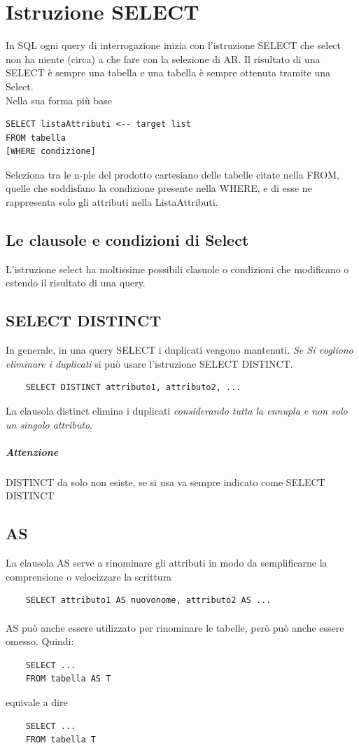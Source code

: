\documentclass[12pt, a4paper, openany]{book}
\begin{document}
\section{Istruzione SELECT}
In SQL ogni query di interrogazione inizia con l'istruzione SELECT che select non ha niente (circa) a che fare con la selezione di AR. Il risultato di una SELECT è sempre una tabella e una tabella è sempre ottenuta tramite una Select.
\\Nella sua forma più base
\begin{lstlisting}
SELECT listaAttributi <-- target list
FROM tabella
[WHERE condizione]
\end{lstlisting}
Seleziona tra le n-ple del prodotto cartesiano delle tabelle citate nella
FROM, quelle che soddisfano la condizione presente nella WHERE, e di
esse ne rappresenta solo gli attributi nella ListaAttributi.
\subsection{Le clausole e condizioni di Select}
L'istruzione select ha moltissime possibili clasuole o condizioni che modificano o estendo il risultato di una query.

\subsection*{SELECT DISTINCT} 
In generale, in una query SELECT i duplicati vengono mantenuti. \emph{Se Si vogliono eliminare i duplicati} si può usare l'istruzione SELECT DISTINCT.
\begin{verbatim}
    SELECT DISTINCT attributo1, attributo2, ...
\end{verbatim}
La clausola distinct elimina i duplicati \emph{considerando tutta la ennupla e non solo un singolo attributo}.
\subparagraph{Attenzione} DISTINCT da solo non esiste, se si usa va sempre indicato come SELECT DISTINCT

\subsection*{AS}
La clausola AS serve a rinominare gli attributi in modo da semplificarne la comprensione o velocizzare la scrittura
\begin{verbatim}
    SELECT attributo1 AS nuovonome, attributo2 AS ...
\end{verbatim}

\paragraph*{} AS può anche essere utilizzato per rinominare le tabelle, però può anche essere omesso. Quindi:
\begin{verbatim}
    SELECT ...
    FROM tabella AS T
\end{verbatim}
equivale a dire
\begin{verbatim}
    SELECT ...
    FROM tabella T
\end{verbatim}
\end{document}
